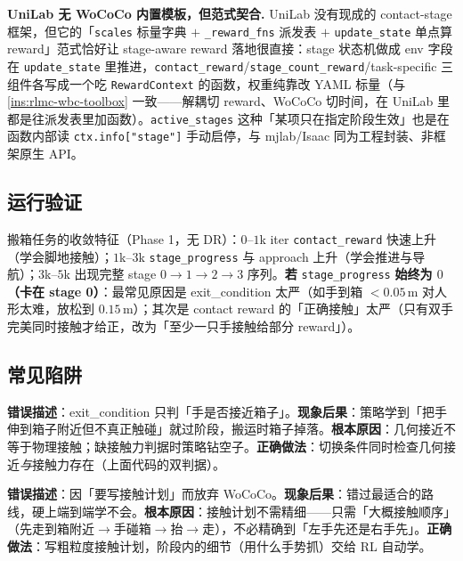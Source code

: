 \begin{note}
\textbf{UniLab 无 WoCoCo 内置模板，但范式契合.}\;
UniLab 没有现成的 contact-stage 框架，但它的「\texttt{scales} 标量字典 $+$ \verb|_reward_fns| 派发表 $+$ \verb|update_state| 单点算 reward」范式恰好让 stage-aware reward 落地很直接：stage 状态机做成 env 字段在 \verb|update_state| 里推进，\verb|contact_reward|/\verb|stage_count_reward|/task-specific 三组件各写成一个吃 \verb|RewardContext| 的函数，权重纯靠改 YAML 标量（与 \cref{ins:rlmc-wbc-toolbox} 一致——解耦切 reward、WoCoCo 切时间，在 UniLab 里都是往派发表里加函数）。\verb|active_stages| 这种「某项只在指定阶段生效」也是在函数内部读 \verb|ctx.info["stage"]| 手动启停，与 mjlab/Isaac 同为工程封装、非框架原生 API\cite{unilab2026}。
\end{note}

\subsection{运行验证}
搬箱任务的收敛特征（Phase 1，无 DR）：$0$--$1$k iter \verb|contact_reward| 快速上升（学会脚地接触）；$1$k--$3$k \verb|stage_progress| 与 approach 上升（学会推进与导航）；$3$k--$5$k 出现完整 stage $0\to1\to2\to3$ 序列。\textbf{若} \verb|stage_progress| \textbf{始终为 $0$（卡在 stage 0）}：最常见原因是 exit\_condition 太严（如手到箱 $<0.05$\,m 对人形太难，放松到 $0.15$\,m）；其次是 contact reward 的「正确接触」太严（只有双手完美同时接触才给正，改为「至少一只手接触给部分 reward」）。

\subsection{常见陷阱}
\begin{pitfall}
\textbf{错误描述}：exit\_condition 只判「手是否接近箱子」。\textbf{现象后果}：策略学到「把手伸到箱子附近但不真正触碰」就过阶段，搬运时箱子掉落。\textbf{根本原因}：几何接近不等于物理接触；缺接触力判据时策略钻空子。\textbf{正确做法}：切换条件同时检查几何接近\emph{与}接触力存在（上面代码的双判据）。
\end{pitfall}
\begin{pitfall}
\textbf{错误描述}：因「要写接触计划」而放弃 WoCoCo。\textbf{现象后果}：错过最适合的路线，硬上端到端学不会。\textbf{根本原因}：接触计划不需精细——只需「大概接触顺序」（先走到箱附近$\to$手碰箱$\to$抬$\to$走），不必精确到「左手先还是右手先」。\textbf{正确做法}：写粗粒度接触计划，阶段内的细节（用什么手势抓）交给 RL 自动学。
\end{pitfall}

